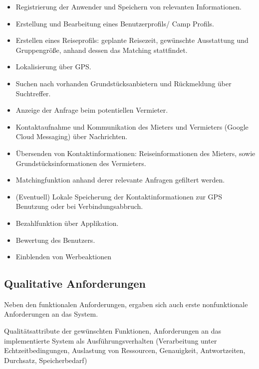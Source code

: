 \begin{itemize}
   \item 
   Registrierung der Anwender und Speichern von relevanten Informationen.
   \item
   Erstellung und Bearbeitung eines Benutzerprofils/ Camp Profils.
   \item
   Erstellen eines Reiseprofils: geplante Reisezeit, gewünschte Ausstattung und Gruppengröße, anhand dessen das Matching stattfindet.
   \item
   Lokalisierung über GPS.
   \item 
   Suchen nach vorhanden Grundstücksanbietern und Rückmeldung über Suchtreffer.
   \item 
   Anzeige der Anfrage beim potentiellen Vermieter.
   \item
   Kontaktaufnahme und Kommunikation des Mieters und Vermieters (Google Cloud Messaging) über Nachrichten.
   \item
   Übersenden von Kontaktinformationen: Reiseinformationen des Mieters, sowie Grundstücksinformationen des Vermieters. 
   \item 
   Matchingfunktion anhand derer relevante Anfragen gefiltert werden.
   \item 
   (Eventuell) Lokale Speicherung der Kontaktinformationen zur GPS Benutzung oder bei Verbindungsabbruch.
   \item
   Bezahlfunktion über Applikation.
   \item
   Bewertung des Benutzers.
   \item
   Einblenden von Werbeaktionen

\end{itemize}

\newpage 

\subsection{Qualitative Anforderungen} 
Neben den funktionalen Anforderungen, ergaben sich auch erste nonfunktionale Anforderungen an das System.


Qualitätsattribute der gewünschten Funktionen,
Anforderungen an das implementierte System als 
Ausführungsverhalten (Verarbeitung unter Echtzeitbedingungen, Auslastung von Ressourcen, Genauigkeit, Antwortzeiten, Durchsatz, Speicherbedarf)

